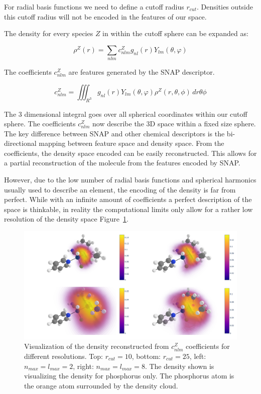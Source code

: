 For radial basis functions we need to define a cutoff radius $r_{cut}$.
Densities outside this cutoff radius will not be encoded in the features of our space.

The density for every species $Z$ in within the cutoff sphere can be expanded as:

$$ \rho^Z(r) = \sum_{nlm} c^Z_{nlm} g_{nl}(r) Y_{lm}(\theta, \varphi) $$

The coefficients $c_{nlm}^Z$ are features generated by the SNAP descriptor.

$$ c_{nlm}^Z = \iiint_{R^3} g_{nl}(r) Y_{lm}(\theta, \varphi) \rho^Z(r, \theta, \phi)  \,dr\theta\phi   $$

The 3 dimensional integral goes over all spherical coordinates within our cutoff sphere.
The coefficients $c^Z_{nlm}$ now describe the 3D space within a fixed size sphere.
\\
The key difference between SNAP and other chemical descriptors is the bi-directional mapping between feature space and 
density space.
From the coefficients, the density space encoded can be easily reconstructed.
This allows for a partial reconstruction of the molecule from the features encoded by SNAP.

However, due to the low number of radial basis functions and spherical harmonics usually used to describe an element, 
the encoding of the density is far from perfect.
While with an infinite amount of coefficients a perfect description of the space is thinkable,
in reality the computational limits only allow for a rather low resolution of the density space Figure~\ref{fig:snap-density}. 
\begin{figure} [h]
  \centering
  \includegraphics[width=1\textwidth]{figures/snap/density/dense.png} %
  \caption[SNAP density visualization]{Visualization of the density reconstructed from $c_{nlm}^Z$ coefficients for different resolutions.
  Top: $r_{cut} = 10$, bottom: $r_{cut} = 25$, left: $n_{max} = l_{max} = 2$, right: $n_{max} = l_{max} = 8$.
  The density shown is visualizing the density for phosphorus only.
  The phosphorus atom is the orange atom surrounded by the density cloud.
  }
  \label{fig:snap-density}
\end{figure}

